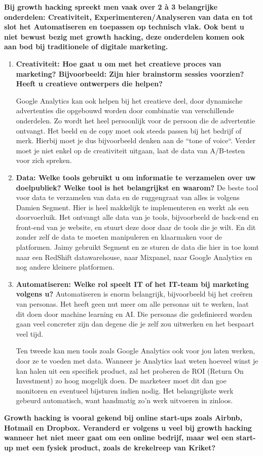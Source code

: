 \textbf{Bij growth hacking spreekt men vaak over 2 à 3 belangrijke onderdelen: Creativiteit, Experimenteren/Analyseren van data en tot slot het Automatiseren en toepassen op technisch vlak. Ook bent u niet bewust bezig met growth hacking, deze onderdelen komen ook aan bod bij traditionele of digitale marketing.}
\begin{enumerate}[label*=\arabic*.]
	\item \textbf{Creativiteit: Hoe gaat u om met het creatieve proces van marketing? Bijvoorbeeld: Zijn hier brainstorm sessies voorzien? Heeft u creatieve ontwerpers die helpen?}
	
	Google Analytics kan ook helpen bij het creatieve deel, door dynamische advertenties die opgebouwd worden door combinatie van verschillende onderdelen. Zo wordt het heel persoonlijk voor de persoon die de advertentie ontvangt. Het beeld en de copy moet ook steeds passen bij het bedrijf of merk. Hierbij moet je dus bijvoorbeeld denken aan de ``tone of voice``. Verder moet je niet enkel op de creativiteit uitgaan, laat de data van A/B-testen voor zich spreken.
	
	\item \textbf{Data: Welke tools gebruikt u om informatie te verzamelen over uw doelpubliek? Welke tool is het belangrijkst en waarom?}
	De beste tool voor data te verzamelen van data en de ruggengraat van alles is volgens Damien Segment. Hier is heel makkelijk te implementeren en werkt als een doorvoerluik. Het ontvangt alle data van je tools, bijvoorbeeld de back-end en front-end van je website, en stuurt deze door daar de tools die je wilt. En dit zonder zelf de data te moeten manipuleren en klaarmaken voor de platformen. Jaimy gebruikt Segment en ze sturen de data die hier in toe komt naar een RedShift datawarehouse, naar Mixpanel, naar Google Analytics en nog andere kleinere platformen.	
	
	\item \textbf{Automatiseren: Welke rol speelt IT of het IT-team bij marketing volgens u? }
	Automatiseren is enorm belangrijk, bijvoorbeeld bij het creëren van personas. Het heeft geen nut meer om alle personas uit te werken, laat dit doen door machine learning en AI. Die personas die gedefinieerd worden gaan veel concreter zijn dan degene die je zelf zou uitwerken en het bespaart veel tijd.
	
	Ten tweede kan men tools zoals Google Analytics ook voor jou laten werken, door ze te voeden met data. Wanneer je Analytics laat weten hoeveel winst je kan halen uit een specifiek product, zal het proberen de ROI (Return On Investment) zo hoog mogelijk doen. De marketeer moet dit dan goe monitoren en eventueel bijsturen indien nodig. Het belangrijkste werk gebeurd automatisch, want handmatig zo'n werk uitvoeren in zinloos.
\end{enumerate}	
\textbf{Growth hacking is vooral gekend bij online start-ups zoals Airbnb, Hotmail en Dropbox. Veranderd er volgens u veel bij growth hacking wanneer het niet meer gaat om een online bedrijf, maar wel een start-up met een fysiek product, zoals de krekelreep van Kriket?}
	

